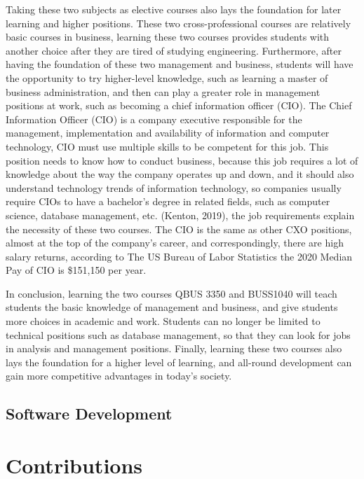 \documentclass[12pt]{article}
\begin{document}
Taking these two subjects as elective courses also lays the foundation for later learning and higher positions. These two cross-professional courses are relatively basic courses in business, learning these two courses provides students with another choice after they are tired of studying engineering. Furthermore, after having the foundation of these two management and business, students will have the opportunity to try higher-level knowledge, such as learning a master of business administration, and then can play a greater role in management positions at work, such as becoming a chief information officer (CIO). The Chief Information Officer (CIO) is a company executive responsible for the management, implementation and availability of information and computer technology, CIO must use multiple skills to be competent for this job. This position needs to know how to conduct business, because this job requires a lot of knowledge about the way the company operates up and down, and it should also understand technology trends of information technology, so companies usually require CIOs to have a bachelor's degree in related fields, such as computer science, database management, etc. (Kenton, 2019), the job requirements explain the necessity of these two courses. The CIO is the same as other CXO positions, almost at the top of the company's career, and correspondingly, there are high salary returns, according to The US Bureau of Labor Statistics the 2020 Median Pay of CIO is \$151,150 per year.

In conclusion, learning the two courses QBUS 3350 and BUSS1040 will teach students the basic knowledge of management and business, and give students more choices in academic and work. Students can no longer be limited to technical positions such as database management, so that they can look for jobs in analysis and management positions. Finally, learning these two courses also lays the foundation for a higher level of learning, and all-round development can gain more competitive advantages in today's society.

\newpage
\subsection{Software Development}



\newpage
\section{Contributions}
\end{document}
